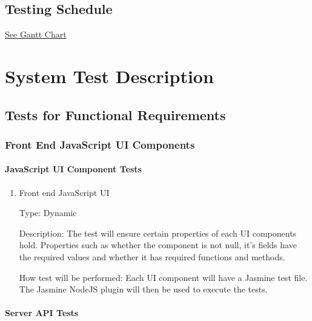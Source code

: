 \documentclass[12pt, titlepage]{article}
\begin{document}
\subsection{Testing Schedule}
		
\href{../DevelopmentPlan/schedule.png}{See Gantt Chart}

\section{System Test Description}
	
\subsection{Tests for Functional Requirements}

\subsubsection{Front End JavaScript UI Components}
		
\paragraph{JavaScript UI Component Tests}

\begin{enumerate}

\item{Front end JavaScript UI\\}

Type: Dynamic
					
Description: The test will ensure certain properties of each UI components
hold.  Properties such as whether the component is not null, it's fields have
the required values and whether it has required functions and methods.

How test will be performed: Each UI component will have a Jasmine test file.
The Jasmine NodeJS plugin will then be used to execute the tests.
					
\end{enumerate}


\paragraph{Server API Tests}
\end{document}
